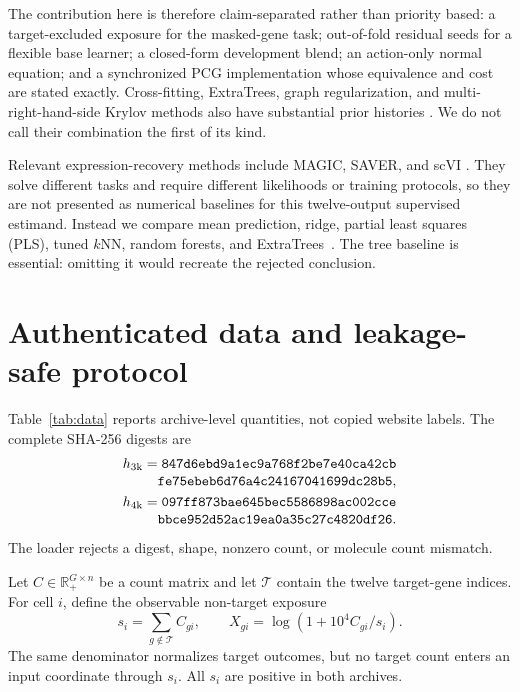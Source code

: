 \documentclass[10pt,letterpaper,twoside]{article}
\newcommand{\R}{\mathbb{R}}
\begin{document}
The contribution here is therefore claim-separated rather than priority based:
a target-excluded exposure for the masked-gene task; out-of-fold residual seeds
for a flexible base learner; a closed-form development blend; an action-only
normal equation; and a synchronized PCG implementation whose equivalence and
cost are stated exactly.  Cross-fitting, ExtraTrees, graph regularization, and
multi-right-hand-side Krylov methods also have substantial prior histories
\cite{geurts2006extremely,oleary1980block}.  We do not call their combination
the first of its kind.

Relevant expression-recovery methods include MAGIC, SAVER, and scVI
\cite{vandijk2018magic,huang2018saver,lopez2018scvi}.  They solve different
tasks and require different likelihoods or training protocols, so they are not
presented as numerical baselines for this twelve-output supervised estimand.
Instead we compare mean prediction, ridge, partial least squares (PLS), tuned
$k$NN, random forests, and ExtraTrees~\cite{hoerl1970ridge,stone1977consistent,
breiman2001random,geurts2006extremely}.  The tree baseline is essential:
omitting it would recreate the rejected conclusion.

\section{Authenticated data and leakage-safe protocol}

\begin{table}[t]
\caption{Archive quantities recomputed from the two unchanged source files.
The complete SHA-256 digests and URLs are stored in the JSON evidence.}
\label{tab:data}
\centering

\end{table}

Table~\ref{tab:data} reports archive-level quantities, not copied website
labels.  The complete SHA-256 digests are
\begin{align*}
 h_{\rm 3k}&=\texttt{847d6ebd9a1ec9a768f2be7e40ca42cb}\notag\\[-0.25em]
 &\phantom{{}=}\texttt{fe75ebeb6d76a4c24167041699dc28b5},\\
 h_{\rm 4k}&=\texttt{097ff873bae645bec5586898ac002cce}\notag\\[-0.25em]
 &\phantom{{}=}\texttt{bbce952d52ac19ea0a35c27c4820df26}.
\end{align*}
The loader rejects a digest, shape, nonzero count, or molecule count mismatch.

Let $C\in\R_+^{G\times n}$ be a count matrix and let $\mathcal T$ contain the
twelve target-gene indices.  For cell $i$, define the observable non-target
exposure
\begin{equation}
 s_i=\sum_{g\notin\mathcal T} C_{gi},\qquad
 X_{gi}=\log\left(1+10^4 C_{gi}/s_i\right).
\label{eq:normalization}
\end{equation}
The same denominator normalizes target outcomes, but no target count enters an
input coordinate through $s_i$.  All $s_i$ are positive in both archives.
\end{document}
